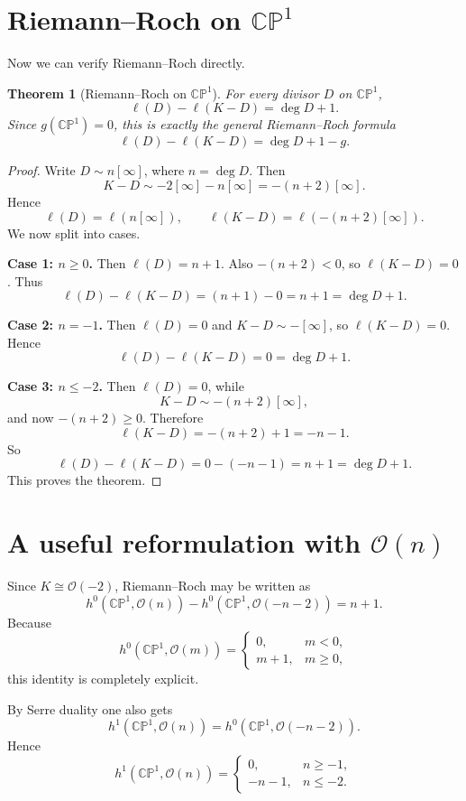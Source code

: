 \documentclass[11pt]{article}
\newcommand{\CP}{\mathbb{CP}}
\newcommand{\OO}{\mathcal{O}}
\newcommand{\degd}{\operatorname{deg}}
\newcommand{\ellD}{\ell}
\newcommand{\CPone}{\CP^1}
\theoremstyle{definition}
\theoremstyle{plain}
\newtheorem{theorem}[definition]{Theorem}
\begin{document}
\section{Riemann--Roch on \texorpdfstring{$\CPone$}{CP1}}
Now we can verify Riemann--Roch directly.

\begin{theorem}[Riemann--Roch on $\CPone$]
For every divisor $D$ on $\CPone$,
\[
\ellD(D)-\ellD(K-D)=\degd D+1.
\]
Since $g(\CPone)=0$, this is exactly the general Riemann--Roch formula
\[
\ellD(D)-\ellD(K-D)=\degd D+1-g.
\]
\end{theorem}

\begin{proof}
Write $D\sim n[\infty]$, where $n=\degd D$. Then
\[
K-D\sim -2[\infty]-n[\infty]=-(n+2)[\infty].
\]
Hence
\[
\ellD(D)=\ellD(n[\infty]),
\qquad
\ellD(K-D)=\ellD(-(n+2)[\infty]).
\]
We now split into cases.

\smallskip
\noindent
\textbf{Case 1: $n\ge 0$.}
Then $\ellD(D)=n+1$. Also $-(n+2)<0$, so $\ellD(K-D)=0$. Thus
\[
\ellD(D)-\ellD(K-D)=(n+1)-0=n+1=\degd D+1.
\]

\smallskip
\noindent
\textbf{Case 2: $n=-1$.}
Then $\ellD(D)=0$ and $K-D\sim -[\infty]$, so $\ellD(K-D)=0$. Hence
\[
\ellD(D)-\ellD(K-D)=0=\degd D+1.
\]

\smallskip
\noindent
\textbf{Case 3: $n\le -2$.}
Then $\ellD(D)=0$, while
\[
K-D\sim -(n+2)[\infty],
\]
and now $-(n+2)\ge 0$. Therefore
\[
\ellD(K-D)=-(n+2)+1=-n-1.
\]
So
\[
\ellD(D)-\ellD(K-D)=0-(-n-1)=n+1=\degd D+1.
\]
This proves the theorem.
\end{proof}

\section{A useful reformulation with \texorpdfstring{$\OO(n)$}{O(n)}}
Since $K\cong \OO(-2)$, Riemann--Roch may be written as
\[
h^0(\CPone,\OO(n))-h^0(\CPone,\OO(-n-2))=n+1.
\]
Because
\[
h^0(\CPone,\OO(m))=
\begin{cases}
0,& m<0,\\
 m+1,& m\ge 0,
\end{cases}
\]
this identity is completely explicit.

By Serre duality one also gets
\[
h^1(\CPone,\OO(n))=h^0(\CPone,\OO(-n-2)).
\]
Hence
\[
h^1(\CPone,\OO(n))=
\begin{cases}
0,& n\ge -1,\\
-n-1,& n\le -2.
\end{cases}
\]
\end{document}
